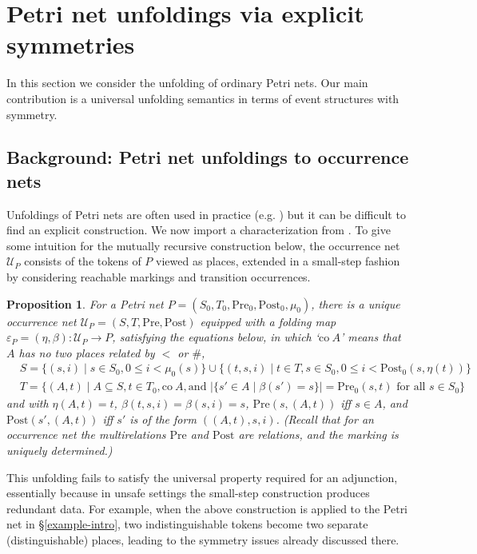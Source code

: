 \documentclass[11pt,a4paper]{article}
\theoremstyle{plain}
\newtheorem{proposition}[theorem]{Proposition}
\theoremstyle{definition}
\theoremstyle{remark}
\newcommand{\calU}{\mathcal{U}}
\newcommand{\Pre}{\mathrm{Pre}}
\newcommand{\Post}{\mathrm{Post}}
\newcommand{\lt}{\ensuremath{<}}
\begin{document}
\section{Petri net unfoldings via explicit symmetries}
\label{sec:unf-sem-sym}

In this section we consider the unfolding of ordinary Petri nets. Our main contribution is a universal unfolding semantics in terms of event structures with symmetry. 

\subsection{Background: Petri net unfoldings to occurrence nets}
Unfoldings of Petri nets are often used in practice (e.g. \cite{UIP}) but it can be difficult to find an explicit construction. We now import a characterization from \cite{GENUN}. To give some intuition for the mutually recursive construction below, the occurrence net $\calU_P$ consists of the tokens of $P$ viewed as places, extended in a small-step fashion by considering reachable markings and transition occurrences. 

\begin{proposition}
\label{prop:winskel}
For a Petri net $P = (S_0, T_0, \Pre_0, \Post_0, \mu_0)$, there is a unique occurrence net $\calU_P = (S, T, \Pre, \Post)$ equipped with a folding map $\varepsilon_P = (\eta, \beta) : \calU_P \to P$, satisfying the equations below, in which `$\mathrm{co} \ A$' means that $A$ has no two places related by $<$ or $\#$,
\begin{align*}
    &S = \{(s, i) \mid s \in S_0, 0 \leq i \lt \mu_0(s)\} 
    \cup
    \{(t, s, i) \mid t \in T, s \in S_0, 0 \leq i < \Post_0(s, \eta(t)) \} \\
    &T = \{ (A, t) \mid A \subseteq S, t \in T_0, \mathrm{co}\ A, \text{and } | \{ s' \in A \mid \beta(s') =  s \}| = \Pre_0(s, t) \text{ for all } s \in S_0 \} 
\end{align*}
and with $\eta(A, t) = t$, $\beta(t, s, i) = \beta(s, i)= s$, $\Pre(s, (A, t))$ iff $s \in A$, and 
$\Post(s', (A, t))$ iff $s'$ is of the form $((A, t), s, i)$. (Recall that for an occurrence net the multirelations $\Pre$ and $\Post$ are relations, and the marking is uniquely determined.) 
\end{proposition}

This unfolding fails to satisfy the universal property required for an adjunction, essentially because in unsafe settings the small-step construction produces redundant data. For example, when the above construction is applied to the Petri net in \S\ref{example-intro}, two indistinguishable tokens become  two separate (distinguishable) places, leading to the symmetry issues already discussed there. 
\end{document}
